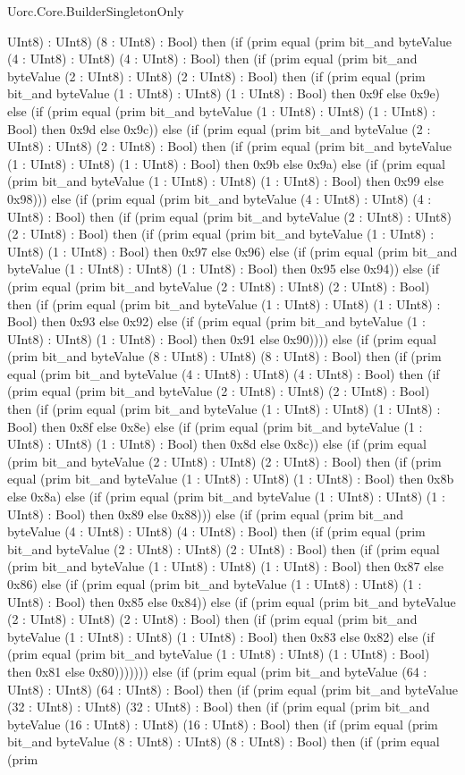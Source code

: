 \begin{lexlean}{Uorc.Core.BuilderSingletonOnly}
\begin{semanticmodule}
{UInt8) : UInt8) (8 : UInt8) : Bool) then (if (prim equal (prim bit_and byteValue (4 : UInt8) : UInt8) (4 : UInt8) : Bool) then (if (prim equal (prim bit_and byteValue (2 : UInt8) : UInt8) (2 : UInt8) : Bool) then (if (prim equal (prim bit_and byteValue (1 : UInt8) : UInt8) (1 : UInt8) : Bool) then 0x9f else 0x9e) else (if (prim equal (prim bit_and byteValue (1 : UInt8) : UInt8) (1 : UInt8) : Bool) then 0x9d else 0x9c)) else (if (prim equal (prim bit_and byteValue (2 : UInt8) : UInt8) (2 : UInt8) : Bool) then (if (prim equal (prim bit_and byteValue (1 : UInt8) : UInt8) (1 : UInt8) : Bool) then 0x9b else 0x9a) else (if (prim equal (prim bit_and byteValue (1 : UInt8) : UInt8) (1 : UInt8) : Bool) then 0x99 else 0x98))) else (if (prim equal (prim bit_and byteValue (4 : UInt8) : UInt8) (4 : UInt8) : Bool) then (if (prim equal (prim bit_and byteValue (2 : UInt8) : UInt8) (2 : UInt8) : Bool) then (if (prim equal (prim bit_and byteValue (1 : UInt8) : UInt8) (1 : UInt8) : Bool) then 0x97 else 0x96) else (if (prim equal (prim bit_and byteValue (1 : UInt8) : UInt8) (1 : UInt8) : Bool) then 0x95 else 0x94)) else (if (prim equal (prim bit_and byteValue (2 : UInt8) : UInt8) (2 : UInt8) : Bool) then (if (prim equal (prim bit_and byteValue (1 : UInt8) : UInt8) (1 : UInt8) : Bool) then 0x93 else 0x92) else (if (prim equal (prim bit_and byteValue (1 : UInt8) : UInt8) (1 : UInt8) : Bool) then 0x91 else 0x90)))) else (if (prim equal (prim bit_and byteValue (8 : UInt8) : UInt8) (8 : UInt8) : Bool) then (if (prim equal (prim bit_and byteValue (4 : UInt8) : UInt8) (4 : UInt8) : Bool) then (if (prim equal (prim bit_and byteValue (2 : UInt8) : UInt8) (2 : UInt8) : Bool) then (if (prim equal (prim bit_and byteValue (1 : UInt8) : UInt8) (1 : UInt8) : Bool) then 0x8f else 0x8e) else (if (prim equal (prim bit_and byteValue (1 : UInt8) : UInt8) (1 : UInt8) : Bool) then 0x8d else 0x8c)) else (if (prim equal (prim bit_and byteValue (2 : UInt8) : UInt8) (2 : UInt8) : Bool) then (if (prim equal (prim bit_and byteValue (1 : UInt8) : UInt8) (1 : UInt8) : Bool) then 0x8b else 0x8a) else (if (prim equal (prim bit_and byteValue (1 : UInt8) : UInt8) (1 : UInt8) : Bool) then 0x89 else 0x88))) else (if (prim equal (prim bit_and byteValue (4 : UInt8) : UInt8) (4 : UInt8) : Bool) then (if (prim equal (prim bit_and byteValue (2 : UInt8) : UInt8) (2 : UInt8) : Bool) then (if (prim equal (prim bit_and byteValue (1 : UInt8) : UInt8) (1 : UInt8) : Bool) then 0x87 else 0x86) else (if (prim equal (prim bit_and byteValue (1 : UInt8) : UInt8) (1 : UInt8) : Bool) then 0x85 else 0x84)) else (if (prim equal (prim bit_and byteValue (2 : UInt8) : UInt8) (2 : UInt8) : Bool) then (if (prim equal (prim bit_and byteValue (1 : UInt8) : UInt8) (1 : UInt8) : Bool) then 0x83 else 0x82) else (if (prim equal (prim bit_and byteValue (1 : UInt8) : UInt8) (1 : UInt8) : Bool) then 0x81 else 0x80))))))) else (if (prim equal (prim bit_and byteValue (64 : UInt8) : UInt8) (64 : UInt8) : Bool) then (if (prim equal (prim bit_and byteValue (32 : UInt8) : UInt8) (32 : UInt8) : Bool) then (if (prim equal (prim bit_and byteValue (16 : UInt8) : UInt8) (16 : UInt8) : Bool) then (if (prim equal (prim bit_and byteValue (8 : UInt8) : UInt8) (8 : UInt8) : Bool) then (if (prim equal (prim }
\end{semanticmodule}
\end{lexlean}
